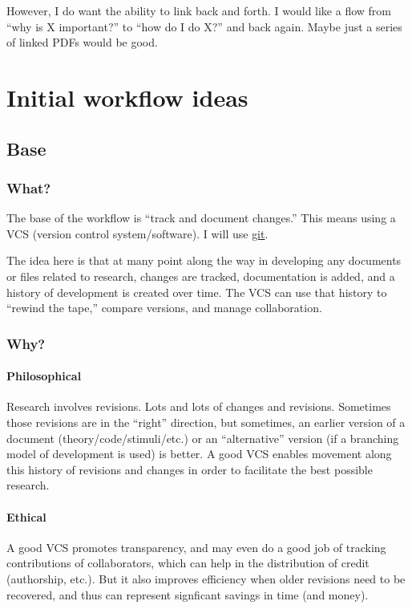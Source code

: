 \documentclass[11pt]{article}
\begin{document}
However, I do want the ability to link back and forth.  I would like a flow from ``why is X important?'' to ``how do I do X?'' and back again. Maybe just a series of linked PDFs would be good.
\section{Initial workflow ideas}
\label{sec-3}
\subsection{Base}
\label{sec-3-1}
\subsubsection{What?}
\label{sec-3-1-1}

The base of the workflow is ``track and document changes.''  This means using a VCS (version control system/software).  I will use \href{http:git-scm.com}{git}.

The idea here is that at many point along the way in developing any documents or files related to research, changes are tracked, documentation is added, and a history of development is created over time. The VCS can use that history to ``rewind the tape,'' compare versions, and manage collaboration.
\subsubsection{Why?}
\label{sec-3-1-2}
\paragraph{Philosophical}
\label{sec-3-1-2-1}

Research involves revisions. Lots and lots of changes and revisions. Sometimes those revisions are in the ``right'' direction, but sometimes, an earlier version of a document (theory/code/stimuli/etc.) or an ``alternative'' version (if a branching model of development is used) is better.  A good VCS enables movement along this history of revisions and changes in order to facilitate the best possible research.
\paragraph{Ethical}
\label{sec-3-1-2-2}

A good VCS promotes transparency, and may even do a good job of tracking contributions of collaborators, which can help in the distribution of credit (authorship, etc.). But it also improves efficiency when older revisions need to be recovered, and thus can represent signficant savings in time (and money).
\end{document}
